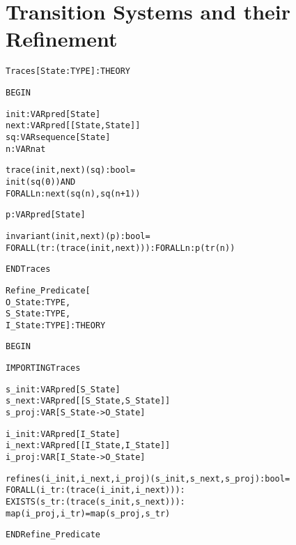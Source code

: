 
\newpage
\section{Transition Systems and their Refinement}

\begin{alltt}
%%%%%%%%%%%%%%%%%%%%%%%%%%%%%%%%%%%%%%%%%%%%%%%%%%%%%%%%%%%%%%%%
% Traces :                                                     %
%   Assuming a transition system (State,init,next) this theory %
%   defines what a trace is and what an invariant is.          %
%%%%%%%%%%%%%%%%%%%%%%%%%%%%%%%%%%%%%%%%%%%%%%%%%%%%%%%%%%%%%%%%

Traces[State : TYPE] : THEORY

BEGIN

  init : VAR pred[State]
  next : VAR pred[[State,State]]
  sq   : VAR sequence[State]
  n    : VAR nat

  trace(init,next)(sq):bool =
    init(sq(0)) AND
    FORALL n: next(sq(n),sq(n+1))

  p  : VAR pred[State]

  invariant(init,next)(p):bool =
    FORALL (tr:(trace(init,next))): FORALL n: p(tr(n))

END Traces
\end{alltt}

\newpage
\begin{alltt}
%%%%%%%%%%%%%%%%%%%%%%%%%%%%%%%%%%%%%%%%%%%%%%%%%%%%%%%%%%%
% Refine_Predicate :                                      %
%   Defines the predicate ``refines'' expressing when one %
%   transition system refines another.                    %
%%%%%%%%%%%%%%%%%%%%%%%%%%%%%%%%%%%%%%%%%%%%%%%%%%%%%%%%%%%

Refine_Predicate[
  O_State : TYPE,
  S_State : TYPE,
  I_State : TYPE] : THEORY

BEGIN

  IMPORTING Traces

  s_init : VAR pred[S_State]
  s_next : VAR pred[[S_State,S_State]]
  s_proj : VAR [S_State -> O_State]

  i_init : VAR pred[I_State]
  i_next : VAR pred[[I_State,I_State]]
  i_proj : VAR [I_State -> O_State]

  refines(i_init,i_next,i_proj)(s_init,s_next,s_proj):bool =
    FORALL (i_tr:(trace(i_init,i_next))):
      EXISTS (s_tr:(trace(s_init,s_next))): 
        map(i_proj,i_tr) = map(s_proj,s_tr)  

END Refine_Predicate
\end{alltt}

